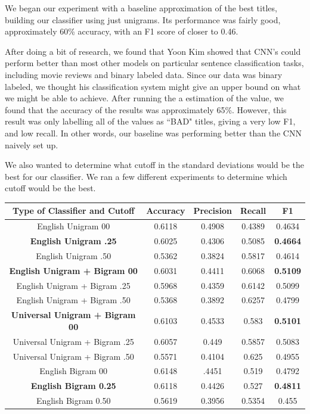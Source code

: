 \documentclass[a4paper,12pt]{article}
\begin{document}
We began our experiment with a baseline approximation of the best titles, building our classifier using just unigrams. Its performance was fairly good, approximately 60\% accuracy, with an F1 score of closer to 0.46.

After doing a bit of research, we found that  Yoon Kim showed that CNN's could perform better than most other models on particular sentence classification tasks, including movie reviews and binary labeled data. Since our data was binary labeled, we thought his classification system might give an upper bound on what we might be able to achieve. After running the a estimation of the value, we found that the accuracy of the results was approximately 65\%. However, this result was only labelling all of the values as ``BAD" titles, giving a very low F1, and low recall. In other words, our baseline was performing better than the CNN naively set up.

We also wanted to determine what cutoff in the standard deviations would be the best for our classifier. We ran a few different experiments to determine which cutoff would be the best. 
 
\begin{center}
 \begin{tabular}{|c| c| c| c| c|} 
 \hline
 Type of Classifier and Cutoff & Accuracy & Precision & Recall & F1 \\ [0.5ex] 
 \hline
 English Unigram 00 & 0.6118  & 0.4908  &0.4389  & 0.4634\\ 
 \hline
 \textbf{English Unigram .25} &  0.6025& 0.4306  & 0.5085  & \textbf{0.4664}\\ 
\hline
 English Unigram .50 & 0.5362  & 0.3824  & 0.5817  & 0.4614\\ 
\hline
  \hline
\textbf{ English Unigram + Bigram 00}& 0.6031  & 0.4411  & 0.6068  &\textbf{0.5109}\\
 \hline
 English Unigram + Bigram .25& 0.5968  & 0.4359  & 0.6142  &0.5099\\
\hline
 English Unigram + Bigram .50& 0.5368  & 0.3892  & 0.6257  &0.4799\\
\hline
 \hline
 \textbf{ Universal Unigram + Bigram 00}& 0.6103  & 0.4533  & 0.583  &\textbf{0.5101}\\
 \hline
 Universal Unigram + Bigram .25& 0.6057  & 0.449  & 0.5857  &0.5083\\
\hline
 Universal Unigram + Bigram .50& 0.5571  & 0.4104  & 0.625  &0.4955\\
\hline
 \hline
English Bigram 00 & 0.6148  & .4451  & 0.519  &0.4792\\
\hline
\textbf{English Bigram  0.25}& 0.6118  & 0.4426  & 0.527  &\textbf{0.4811}\\
\hline
English Bigram 0.50 & 0.5619  & 0.3956  & 0.5354  & 0.455\\
\hline

\end{tabular}
\end{center}
\end{document}
